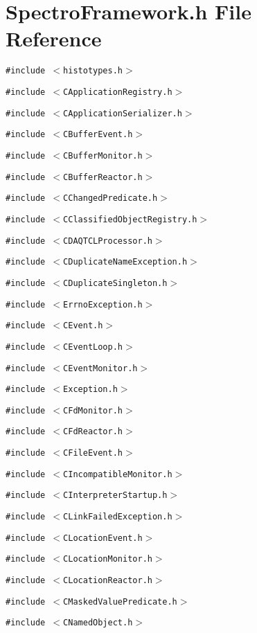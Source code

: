 \section{Spectro\-Framework.h File Reference}
\label{SpectroFramework_8h}
{\tt \#include $<$histotypes.h$>$}\par
{\tt \#include $<$CApplication\-Registry.h$>$}\par
{\tt \#include $<$CApplication\-Serializer.h$>$}\par
{\tt \#include $<$CBuffer\-Event.h$>$}\par
{\tt \#include $<$CBuffer\-Monitor.h$>$}\par
{\tt \#include $<$CBuffer\-Reactor.h$>$}\par
{\tt \#include $<$CChanged\-Predicate.h$>$}\par
{\tt \#include $<$CClassified\-Object\-Registry.h$>$}\par
{\tt \#include $<$CDAQTCLProcessor.h$>$}\par
{\tt \#include $<$CDuplicate\-Name\-Exception.h$>$}\par
{\tt \#include $<$CDuplicate\-Singleton.h$>$}\par
{\tt \#include $<$Errno\-Exception.h$>$}\par
{\tt \#include $<$CEvent.h$>$}\par
{\tt \#include $<$CEvent\-Loop.h$>$}\par
{\tt \#include $<$CEvent\-Monitor.h$>$}\par
{\tt \#include $<$Exception.h$>$}\par
{\tt \#include $<$CFd\-Monitor.h$>$}\par
{\tt \#include $<$CFd\-Reactor.h$>$}\par
{\tt \#include $<$CFile\-Event.h$>$}\par
{\tt \#include $<$CIncompatible\-Monitor.h$>$}\par
{\tt \#include $<$CInterpreter\-Startup.h$>$}\par
{\tt \#include $<$CLink\-Failed\-Exception.h$>$}\par
{\tt \#include $<$CLocation\-Event.h$>$}\par
{\tt \#include $<$CLocation\-Monitor.h$>$}\par
{\tt \#include $<$CLocation\-Reactor.h$>$}\par
{\tt \#include $<$CMasked\-Value\-Predicate.h$>$}\par
{\tt \#include $<$CNamed\-Object.h$>$}\par
